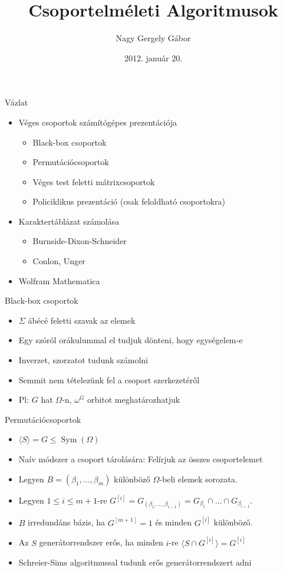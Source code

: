 \documentclass[mathserif]{beamer}
\DeclareMathOperator{\Sym}{Sym}
\begin{document}
\title[Csoportelméleti Algoritmusok]{Csoportelméleti Algoritmusok}
\author{Nagy Gergely Gábor}
\date{2012. január 20.}

\begin{frame}
\titlepage
\end{frame}

\begin{frame}{Vázlat}
\begin{itemize}
\item Véges csoportok számítógépes prezentációja
	\begin{itemize}
	\item Black-box csoportok
	\item Permutációcsoportok
	\item Véges test feletti mátrixcsoportok
	\item Policiklikus prezentáció (csak feloldható csoportokra)
	\end{itemize}
\item Karaktertáblázat számolása
	\begin{itemize}
	\item Burnside-Dixon-Schneider
	\item Conlon, Unger
	\end{itemize}
\item Wolfram Mathematica
\end{itemize}
\end{frame}

\begin{frame}{Black-box csoportok}
\begin{itemize}
\item $\Sigma$ ábécé feletti szavak az elemek
\item Egy szóról orákulummal el tudjuk dönteni, hogy egységelem-e
\item Inverzet, szorzatot tudunk számolni
\item Semmit nem tételezünk fel a csoport szerkezetéről
\item Pl: $G$ hat $\Omega$-n, $\omega^G$ orbitot meghatározhatjuk
\end{itemize}
\end{frame}

\begin{frame}{Permutációcsoportok}
\begin{itemize}
\item $\langle S \rangle = G \le \Sym(\Omega)$
\item Naív módszer a csoport tárolására: Felírjuk az összes csoportelemet
\item Legyen $B = (\beta_1, \dots, \beta_m)$ különböző $\Omega$-beli elemek sorozata.
\item Legyen $1\le i\le m+1$-re $G^{[i]} = G_{(\beta_1,\dots,\beta_{i-1})} = G_{\beta_1}\cap\dots\cap G_{\beta_{i-1}}$.
\item $B$ irredundáns bázis, ha $G^{[m+1]}=1$ és minden $G^{[i]}$ különböző.
\item Az $S$ generátorrendszer erős, ha minden $i$-re $\langle S \cap G^{[i]}\rangle = G^{[i]}$
\item Schreier-Sims algoritmussal tudunk erős generátorrendszert adni
\end{itemize}
\end{frame}
\end{document}
